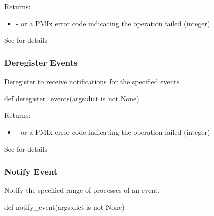 Returns:
\begin{itemize}
    \item {} -  or a \ac{PMIx} error code indicating the operation failed (integer)
\end{itemize}

See  for details


\subsubsection{Deregister Events}

\summary

Deregister to receive notifications for the specified events.

\format

\pyspecificstart
\begin{codepar}
def deregister_events(args:dict is not None)
\end{codepar}
\pyspecificend

\begin{arglist}
\end{arglist}

Returns:
\begin{itemize}
    \item {} -  or a \ac{PMIx} error code indicating the operation failed (integer)
\end{itemize}

See  for details


\subsubsection{Notify Event}

\summary

Notify the specified range of processes of an event.

\format

\pyspecificstart
\begin{codepar}
def notify_event(args:dict is not None)
\end{codepar}
\pyspecificend

